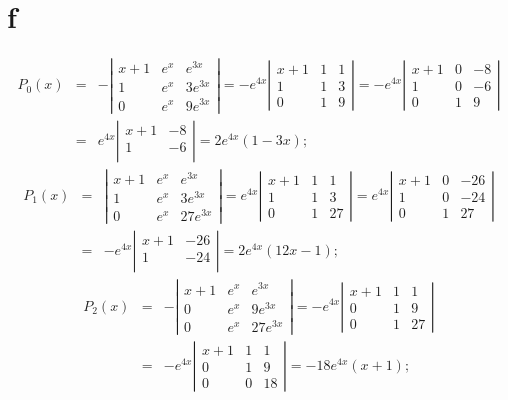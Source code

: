 \documentclass[dvips]{book}
\numberwithin{example}{section}
\numberwithin{equation}{section}
\numberwithin{theorem}{section}
\numberwithin{table}{section}
\numberwithin{figure}{section}
\begin{document}
\part{f}
\begin{eqnarray*}
P_0(x)&=&
-\left|\begin{array}{ccc}
x+1&e^x&e^{3x}\\
1&e^x&3e^{3x}\\
0&e^x&9e^{3x}
\end{array}\right|=
-e^{4x}\left|\begin{array}{ccc}
x+1&1&1\\
1&1&3\\
0&1&9
\end{array}\right|=
-e^{4x}\left|\begin{array}{ccc}
x+1&0&-8\\
1&0&-6\\
0&1&9
\end{array}\right|\\
&=&e^{4x}\left|\begin{array}{cc}
x+1&-8\\
1&-6\\
\end{array}\right|
=2e^{4x}(1-3x);
\end{eqnarray*}
\begin{eqnarray*}
P_1(x)&=&
\left|\begin{array}{ccc}
x+1&e^x&e^{3x}\\
1&e^x&3e^{3x}\\
0&e^x&27e^{3x}
\end{array}\right|=
e^{4x}\left|\begin{array}{ccc}
x+1&1&1\\
1&1&3\\
0&1&27
\end{array}\right|=
e^{4x}\left|\begin{array}{ccc}
x+1&0&-26\\
1&0&-24\\
0&1&27
\end{array}\right|\\
&=&-e^{4x}\left|\begin{array}{ccc}
x+1&-26\\
1&-24\\
\end{array}\right|=2e^{4x}(12x-1);
\end{eqnarray*}
\begin{eqnarray*}
P_2(x)&=&
-\left|\begin{array}{ccc}
x+1&e^x&e^{3x}\\
0&e^x&9e^{3x}\\
0&e^x&27e^{3x}
\end{array}\right|=
-e^{4x}\left|\begin{array}{ccc}
x+1&1&1\\
0&1&9\\
0&1&27
\end{array}\right|\\
&=&-e^{4x}\left|\begin{array}{ccc}
x+1&1&1\\
0&1&9\\
0&0&18
\end{array}\right|=-18e^{4x}(x+1);
\end{eqnarray*}
\end{document}
